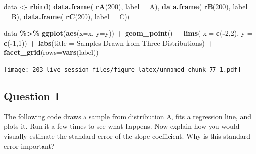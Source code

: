 \documentclass[
]{book}
\newenvironment{Shaded}{\begin{snugshade}}{\end{snugshade}}
\newcommand{\AttributeTok}[1]{\textcolor[rgb]{0.13,0.29,0.53}{#1}}
\newcommand{\DecValTok}[1]{\textcolor[rgb]{0.00,0.00,0.81}{#1}}
\newcommand{\FunctionTok}[1]{\textcolor[rgb]{0.13,0.29,0.53}{\textbf{#1}}}
\newcommand{\NormalTok}[1]{#1}
\newcommand{\OtherTok}[1]{\textcolor[rgb]{0.56,0.35,0.01}{#1}}
\newcommand{\SpecialCharTok}[1]{\textcolor[rgb]{0.81,0.36,0.00}{\textbf{#1}}}
\newcommand{\StringTok}[1]{\textcolor[rgb]{0.31,0.60,0.02}{#1}}
\theoremstyle{definition}
\theoremstyle{definition}
\theoremstyle{definition}
\theoremstyle{definition}
\theoremstyle{remark}
\begin{document}
\begin{Shaded}
\begin{Highlighting}[]
\NormalTok{data }\OtherTok{\textless{}{-}} \FunctionTok{rbind}\NormalTok{( }
  \FunctionTok{data.frame}\NormalTok{( }\FunctionTok{rA}\NormalTok{(}\DecValTok{200}\NormalTok{), }\AttributeTok{label =} \StringTok{\textquotesingle{}A\textquotesingle{}}\NormalTok{),}
  \FunctionTok{data.frame}\NormalTok{( }\FunctionTok{rB}\NormalTok{(}\DecValTok{200}\NormalTok{), }\AttributeTok{label =} \StringTok{\textquotesingle{}B\textquotesingle{}}\NormalTok{),}
  \FunctionTok{data.frame}\NormalTok{( }\FunctionTok{rC}\NormalTok{(}\DecValTok{200}\NormalTok{), }\AttributeTok{label =} \StringTok{\textquotesingle{}C\textquotesingle{}}\NormalTok{))}
\end{Highlighting}
\end{Shaded}

\begin{Shaded}
\begin{Highlighting}[]
\NormalTok{data }\SpecialCharTok{\%\textgreater{}\%} 
  \FunctionTok{ggplot}\NormalTok{(}\FunctionTok{aes}\NormalTok{(}\AttributeTok{x=}\NormalTok{x, }\AttributeTok{y=}\NormalTok{y)) }\SpecialCharTok{+} 
  \FunctionTok{geom\_point}\NormalTok{() }\SpecialCharTok{+} 
  \FunctionTok{lims}\NormalTok{(}
    \AttributeTok{x =} \FunctionTok{c}\NormalTok{(}\SpecialCharTok{{-}}\DecValTok{2}\NormalTok{,}\DecValTok{2}\NormalTok{), }
    \AttributeTok{y =} \FunctionTok{c}\NormalTok{(}\SpecialCharTok{{-}}\DecValTok{1}\NormalTok{,}\DecValTok{1}\NormalTok{)) }\SpecialCharTok{+} 
  \FunctionTok{labs}\NormalTok{(}\AttributeTok{title =} \StringTok{\textquotesingle{}Samples Drawn from Three Distributions\textquotesingle{}}\NormalTok{) }\SpecialCharTok{+} 
  \FunctionTok{facet\_grid}\NormalTok{(}\AttributeTok{rows=}\FunctionTok{vars}\NormalTok{(label))}
\end{Highlighting}
\end{Shaded}

\texttt{[image: 203-live-session\_files/figure-latex/unnamed-chunk-77-1.pdf]}

\hypertarget{question-1}{%
\subsection{Question 1}\label{question-1}}

The following code draws a sample from distribution A, fits a regression line, and plots it. Run it a few times to see what happens. Now explain how you would visually estimate the standard error of the slope coefficient. Why is this standard error important?
\end{document}
